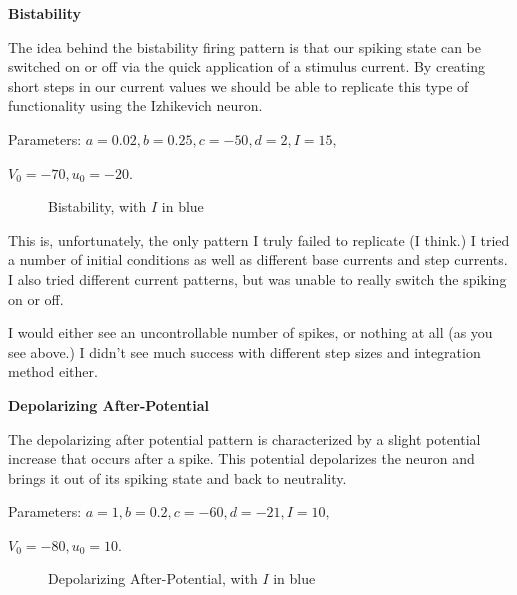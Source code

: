 \documentclass[a4paper,12pt]{article}
\begin{document}
\vfil\eject

{\bf Bistability}
\bigskip

The idea behind the bistability firing pattern is that our spiking state can be switched on or off via the quick application of a stimulus current. By creating short steps in our current values we should be able to replicate this type of functionality using the Izhikevich neuron. 
 
\vspace{2mm} 

Parameters: $a=0.02, b=0.25, c=-50, d=2, I=15, $

\vspace{1mm}

$V_{0}=-70, u_{0}=-20$. 

\begin{figure}[h!]
\begin{center}
\end{center}
\caption{\label{pict16}Bistability, with $I$ in blue}
\end{figure}

This is, unfortunately, the only pattern I truly failed to replicate (I think.) I tried a number of initial conditions as well as different base currents and step currents. I also tried different current patterns, but was unable to really switch the spiking on or off. 

\vspace{2mm}

I would either see an uncontrollable number of spikes, or nothing at all (as you see above.) I didn't see much success with different step sizes and integration method either. 

\vfil\eject

{\bf Depolarizing After-Potential}
\bigskip

The depolarizing after potential pattern is characterized by a slight potential increase that occurs after a spike. This potential depolarizes the neuron and brings it out of its spiking state and back to neutrality.  

\vspace{2mm} 

Parameters: $a=1, b=0.2, c=-60, d=-21, I=10, $

\vspace{1mm}

$V_{0}=-80, u_{0}=10$. 

\begin{figure}[h!]
\begin{center}
\end{center}
\caption{\label{pict17}Depolarizing After-Potential, with $I$ in blue}
\end{figure}
\end{document}
